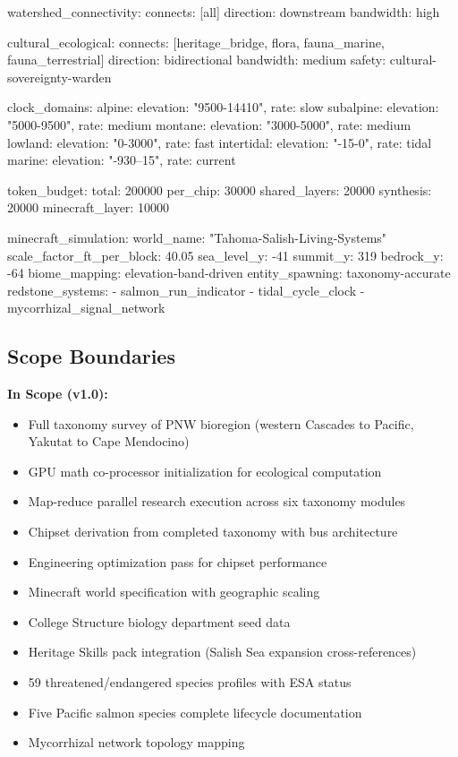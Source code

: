 \documentclass[11pt,letterpaper]{article}
\begin{document}
\begin{asciibox}
  watershed_connectivity:
    connects: [all]
    direction: downstream
    bandwidth: high

  cultural_ecological:
    connects: [heritage_bridge, flora, fauna_marine, fauna_terrestrial]
    direction: bidirectional
    bandwidth: medium
    safety: cultural-sovereignty-warden

clock_domains:
  alpine:       { elevation: "9500-14410", rate: slow }
  subalpine:    { elevation: "5000-9500",  rate: medium }
  montane:      { elevation: "3000-5000",  rate: medium }
  lowland:      { elevation: "0-3000",     rate: fast }
  intertidal:   { elevation: "-15-0",      rate: tidal }
  marine:       { elevation: "-930--15",   rate: current }

token_budget:
  total: 200000
  per_chip: 30000
  shared_layers: 20000
  synthesis: 20000
  minecraft_layer: 10000

minecraft_simulation:
  world_name: "Tahoma-Salish-Living-Systems"
  scale_factor_ft_per_block: 40.05
  sea_level_y: -41
  summit_y: 319
  bedrock_y: -64
  biome_mapping: elevation-band-driven
  entity_spawning: taxonomy-accurate
  redstone_systems:
    - salmon_run_indicator
    - tidal_cycle_clock
    - mycorrhizal_signal_network
\end{asciibox}

\subsection{Scope Boundaries}

\textbf{In Scope (v1.0):}
\begin{itemize}[leftmargin=2em]
\item Full taxonomy survey of PNW bioregion (western Cascades to Pacific, Yakutat to Cape Mendocino)
\item GPU math co-processor initialization for ecological computation
\item Map-reduce parallel research execution across six taxonomy modules
\item Chipset derivation from completed taxonomy with bus architecture
\item Engineering optimization pass for chipset performance
\item Minecraft world specification with geographic scaling
\item College Structure biology department seed data
\item Heritage Skills pack integration (Salish Sea expansion cross-references)
\item 59 threatened/endangered species profiles with ESA status
\item Five Pacific salmon species complete lifecycle documentation
\item Mycorrhizal network topology mapping
\end{itemize}
\end{document}
